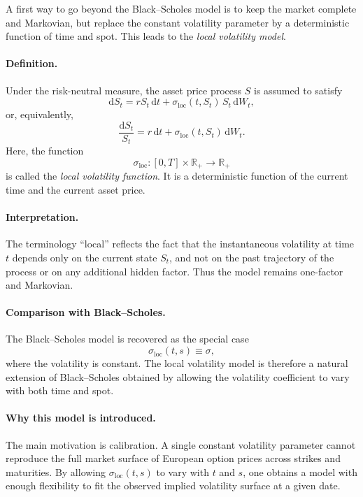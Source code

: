 \documentclass[11pt]{article}
\newcommand{\R}{\mathbb{R}}
\theoremstyle{plain}
\theoremstyle{definition}
\theoremstyle{remark}
\begin{document}
A first way to go beyond the Black--Scholes model is to keep the market
complete and Markovian, but replace the constant volatility parameter by
a deterministic function of time and spot. This leads to the
\emph{local volatility model}. 

\paragraph{Definition.}
Under the risk-neutral measure, the asset price process \(S\) is assumed
to satisfy
\[
\mathrm{d}S_t
=
rS_t\,\mathrm{d}t
+
\sigma_{\mathrm{loc}}(t,S_t)\,S_t\,\mathrm{d}W_t,
\]
or, equivalently,
\[
\frac{\mathrm{d}S_t}{S_t}
=
r\,\mathrm{d}t
+
\sigma_{\mathrm{loc}}(t,S_t)\,\mathrm{d}W_t.
\]
Here, the function
\[
\sigma_{\mathrm{loc}}:[0,T]\times \R_+ \to \R_+
\]
is called the \emph{local volatility function}. It is a deterministic
function of the current time and the current asset price. 

\paragraph{Interpretation.}
The terminology ``local'' reflects the fact that the instantaneous
volatility at time \(t\) depends only on the current state \(S_t\), and
not on the past trajectory of the process or on any additional hidden
factor. Thus the model remains one-factor and Markovian. 

\paragraph{Comparison with Black--Scholes.}
The Black--Scholes model is recovered as the special case
\[
\sigma_{\mathrm{loc}}(t,s)\equiv \sigma,
\]
where the volatility is constant.
The local volatility model is therefore a natural extension of
Black--Scholes obtained by allowing the volatility coefficient to vary
with both time and spot. 

\paragraph{Why this model is introduced.}
The main motivation is calibration.
A single constant volatility parameter cannot reproduce the full market
surface of European option prices across strikes and maturities.
By allowing \(\sigma_{\mathrm{loc}}(t,s)\) to vary with \(t\) and \(s\),
one obtains a model with enough flexibility to fit the observed implied
volatility surface at a given date. 
\end{document}
